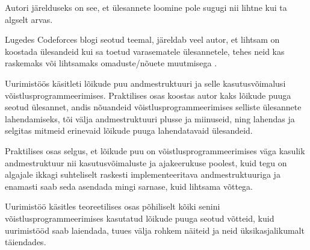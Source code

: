 \documentclass{trkut}
\begin{document}
Autori järelduseks on see, et ülesannete loomine pole sugugi nii lihtne kui ta algselt arvas.

Lugedes Codeforces blogi seotud teemal, järeldab veel autor, et lihtsam on koostada ülesandeid kui sa toetud varasematele ülesannetele, tehes neid kas raskemaks või lihtsamaks omaduste/nõuete muutmisega \parencite{problemsetting}.


Uurimistöös käsitleti lõikude puu andmestruktuuri ja selle kasutusvõimalusi võistlusprogrammeerimises. Praktilises osas koostas autor kaks lõikude puuga seotud ülesannet, andis nõuandeid võistlusprogrammeerimises selliste ülesannete lahendamiseks, tõi välja andmestruktuuri plusse ja miinuseid, ning lahendas ja selgitas mitmeid erinevaid lõikude puuga lahendatavaid ülesandeid.

Praktilises osas selgus, et lõikude puu on võistlusprogrammeerimises väga kasulik andmestruktuur nii kasutusvõimaluste ja ajakeerukuse poolest, kuid tegu on algajale ikkagi suhteliselt raskesti implementeeritava andmestruktuuriga ja enamasti saab seda asendada mingi sarnase, kuid lihtsama võttega.

Uurimistöö käsitles teoreetilises osas põhiliselt kõiki senini võistlusprogrammeerimises kasutatud lõikude puuga seotud võtteid, kuid uurimistööd saab laiendada, tuues välja rohkem näiteid ja neid üksikasjalikumalt täiendades.


\printbibliography
\end{document}
